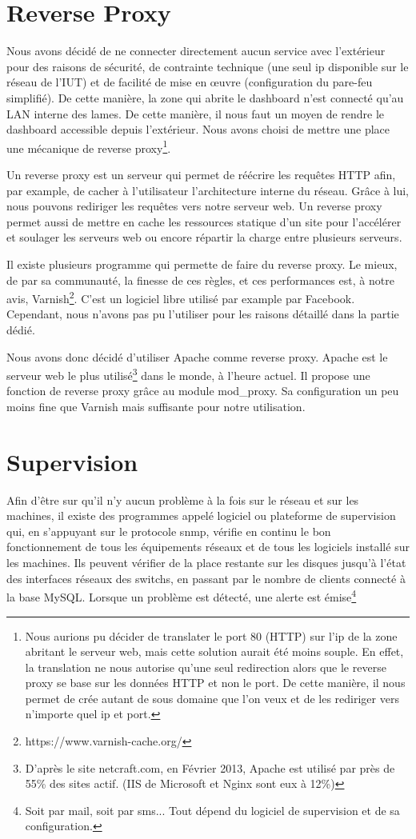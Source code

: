 \documentclass[a4paper,oneside]{report}
\begin{document}
\section{Reverse Proxy}
Nous avons décidé de ne connecter directement aucun service avec l'extérieur pour des raisons de sécurité, de contrainte technique (une seul ip disponible sur le réseau de l'IUT) et de facilité de mise en œuvre (configuration du pare-feu simplifié).
De cette manière, la zone qui abrite le dashboard n'est connecté qu'au LAN interne des lames.
De cette manière, il nous faut un moyen de rendre le dashboard accessible depuis l'extérieur. Nous avons choisi de mettre une place une mécanique de reverse proxy\footnote{Nous aurions pu décider de translater le port 80 (HTTP) sur l'ip de la zone abritant le serveur web, mais cette solution aurait été moins souple.
En effet, la translation ne nous autorise qu'une seul redirection alors que le reverse proxy se base sur les données HTTP et non le port. De cette manière, il nous permet de crée autant de sous domaine que l'on veux et de les rediriger vers n'importe quel ip et port.}.

Un reverse proxy est un serveur qui permet de réécrire les requêtes HTTP afin, par example, de cacher à l'utilisateur l'architecture interne du réseau.
Grâce à lui, nous pouvons rediriger les requêtes vers notre serveur web.
Un reverse proxy permet aussi de mettre en cache les ressources statique d'un site pour l'accélérer et soulager les serveurs web ou encore répartir la charge entre plusieurs serveurs.

Il existe plusieurs programme qui permette de faire du reverse proxy.
Le mieux, de par sa communauté, la finesse de ces règles, et ces performances est, à notre avis, Varnish\footnote{https://www.varnish-cache.org/}.
C'est un logiciel libre utilisé par example par Facebook. Cependant, nous n'avons pas pu l'utiliser pour les raisons détaillé dans la partie dédié.

Nous avons donc décidé d'utiliser Apache comme reverse proxy. Apache est le serveur web le plus utilisé\footnote{D'après le site netcraft.com, en Février 2013, Apache est utilisé par près de 55\% des sites actif. (IIS de Microsoft et Nginx sont eux à 12\%)} dans le monde, à l'heure actuel.
Il propose une fonction de reverse proxy grâce au module mod\_proxy. Sa configuration un peu moins fine que Varnish mais suffisante pour notre utilisation.

\section{Supervision}
Afin d'être sur qu'il n'y aucun problème à la fois sur le réseau et sur les machines, il existe des programmes appelé logiciel ou plateforme de supervision qui, en s'appuyant sur le protocole snmp, vérifie en continu le bon fonctionnement de tous les équipements réseaux et de tous les logiciels installé sur les machines.
Ils peuvent vérifier de la place restante sur les disques jusqu'à l'état des interfaces réseaux des switchs, en passant par le nombre de clients connecté à la base MySQL.
Lorsque un problème est détecté, une alerte est émise\footnote{Soit par mail, soit par sms... Tout dépend du logiciel de supervision et de sa configuration.}
\end{document}
